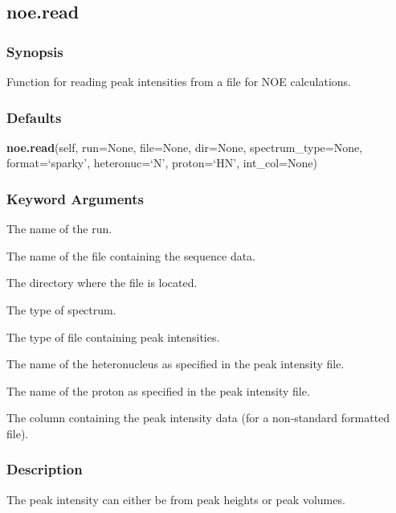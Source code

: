 \newpage

\subsection{noe.read}


\subsubsection{Synopsis}

Function for reading peak intensities from a file for NOE calculations.



\subsubsection{Defaults}

\textsf{\textbf{noe.read}(self, run=None, file=None, dir=None, spectrum\_type=None, format=`sparky', heteronuc=`N', proton=`HN', int\_col=None)}


\subsubsection{Keyword Arguments}

  The name of the run. 

  The name of the file containing the sequence data. 

  The directory where the file is located. 

  The type of spectrum. 

  The type of file containing peak intensities. 

  The name of the heteronucleus as specified in the peak intensity file. 

  The name of the proton as specified in the peak intensity file. 

  The column containing the peak intensity data (for a non-standard formatted file). 




\subsubsection{Description}

The peak intensity can either be from peak heights or peak volumes.


